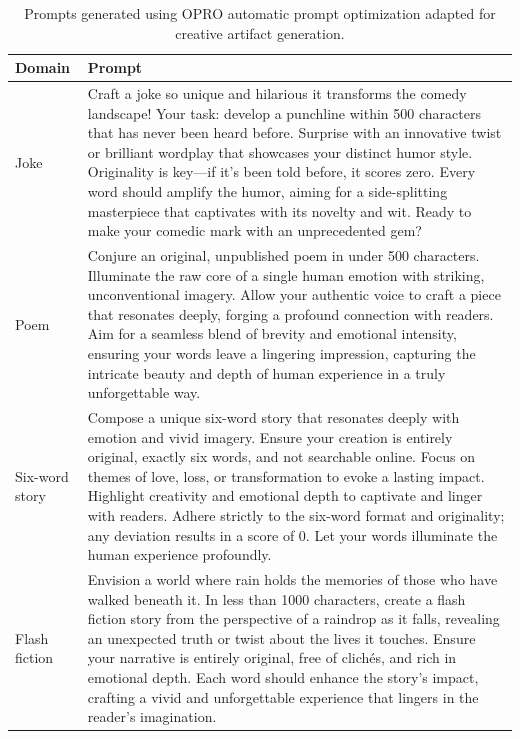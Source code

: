 \documentclass[phd,electronic,oneside,twosidetoc,letterpaper,chaptercenter,parttop,lof]{byumsphd}
\begin{document}
\begin{table}[t!]
\centering
\begin{tabular}{|p{}|p{}|}
\hline
\textbf{Domain} & \textbf{Prompt} \\
\hline
Joke & Craft a joke so unique and hilarious it transforms the comedy landscape! Your task: develop a punchline within 500 characters that has never been heard before. Surprise with an innovative twist or brilliant wordplay that showcases your distinct humor style. Originality is key—if it's been told before, it scores zero. Every word should amplify the humor, aiming for a side-splitting masterpiece that captivates with its novelty and wit. Ready to make your comedic mark with an unprecedented gem?\\
\hline
Poem & Conjure an original, unpublished poem in under 500 characters. Illuminate the raw core of a single human emotion with striking, unconventional imagery. Allow your authentic voice to craft a piece that resonates deeply, forging a profound connection with readers. Aim for a seamless blend of brevity and emotional intensity, ensuring your words leave a lingering impression, capturing the intricate beauty and depth of human experience in a truly unforgettable way. \\
\hline
Six-word story & Compose a unique six-word story that resonates deeply with emotion and vivid imagery. Ensure your creation is entirely original, exactly six words, and not searchable online. Focus on themes of love, loss, or transformation to evoke a lasting impact. Highlight creativity and emotional depth to captivate and linger with readers. Adhere strictly to the six-word format and originality; any deviation results in a score of 0. Let your words illuminate the human experience profoundly. \\
\hline
Flash fiction & Envision a world where rain holds the memories of those who have walked beneath it. In less than 1000 characters, create a flash fiction story from the perspective of a raindrop as it falls, revealing an unexpected truth or twist about the lives it touches. Ensure your narrative is entirely original, free of clichés, and rich in emotional depth. Each word should enhance the story's impact, crafting a vivid and unforgettable experience that lingers in the reader's imagination. \\
\hline
\end{tabular}
\caption{Prompts generated using OPRO automatic prompt optimization adapted for creative artifact generation.}
\label{tab:opro-prompts}
\end{table}
\end{document}
